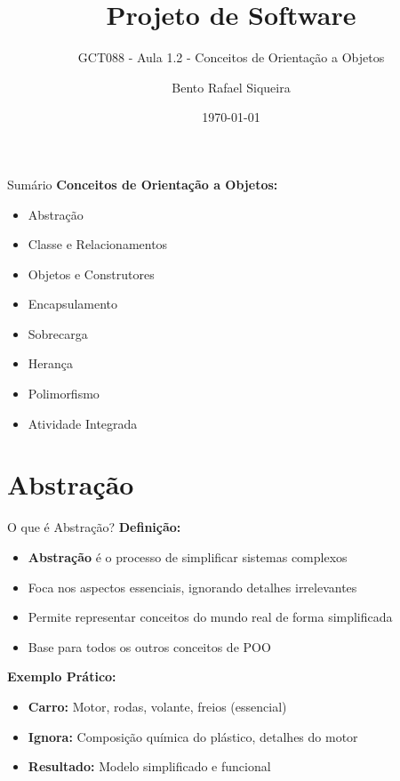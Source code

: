 \documentclass[aspectratio=169]{beamer}
\title{Projeto de Software}
\subtitle{GCT088 - Aula 1.2 - Conceitos de Orientação a Objetos}
\author{Bento Rafael Siqueira}
\institute{Universidade Federal de Lavras (UFLA)}
\date{\today}
\begin{document}
\begin{frame}
\titlepage
\end{frame}

\begin{frame}{Sumário}
\textbf{Conceitos de Orientação a Objetos:}
\begin{itemize}
    \item Abstração
    \item Classe e Relacionamentos
    \item Objetos e Construtores
    \item Encapsulamento
    \item Sobrecarga
    \item Herança
    \item Polimorfismo
    \item Atividade Integrada
\end{itemize}
\end{frame}

\section{Abstração}

\begin{frame}{O que é Abstração?}
\textbf{Definição:}
\begin{itemize}
    \item \textbf{Abstração} é o processo de simplificar sistemas complexos
    \item Foca nos aspectos essenciais, ignorando detalhes irrelevantes
    \item Permite representar conceitos do mundo real de forma simplificada
    \item Base para todos os outros conceitos de POO
\end{itemize}

\textbf{Exemplo Prático:}
\begin{itemize}
    \item \textbf{Carro:} Motor, rodas, volante, freios (essencial)
    \item \textbf{Ignora:} Composição química do plástico, detalhes do motor
    \item \textbf{Resultado:} Modelo simplificado e funcional
\end{itemize}
\end{frame}
\end{document}
